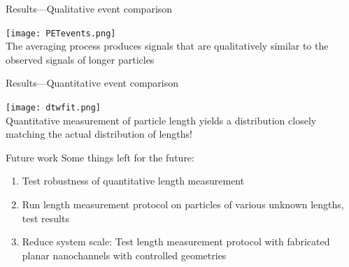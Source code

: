 
\begin{frame}[c]{Results---Qualitative event comparison}
	{\centering
		\texttt{[image: PETevents.png]} \\
		\textcolor{negativered}{The averaging process produces signals that are qualitatively similar to the observed signals of longer particles}
		\par
	}
\end{frame}




\begin{frame}[c]{Results---Quantitative event comparison}
	{\centering
		\texttt{[image: dtwfit.png]} \\
		\textcolor{negativered}{Quantitative measurement of particle length yields a distribution closely matching the actual distribution of lengths!}
		\par
	}
\end{frame}




\begin{frame}[c]{Future work}
	Some things left for the future:
	\begin{enumerate}
		\item Test robustness of quantitative length measurement
		\item Run length measurement protocol on particles of various unknown lengths, test results
		\item Reduce system scale: Test length measurement protocol with fabricated planar nanochannels with controlled geometries
	\end{enumerate}
\end{frame}



